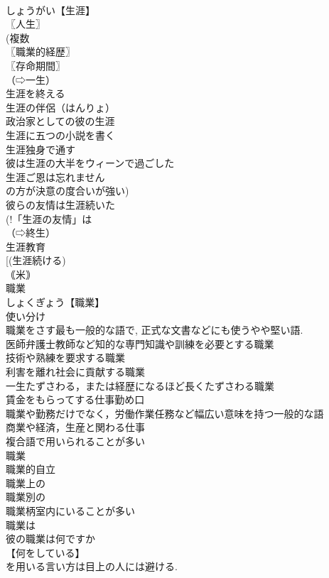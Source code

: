 \documentclass[8pt]{extreport}
\begin{document}
\begin{CJK}{UTF8}{min}
\\	しょうがい【生涯】
\\	〖人生〗
\\	(複数 
\\	〖職業的経歴〗
\\	〖存命期間〗
\\	（⇨一生）
\\	生涯を終える
\\	生涯の伴侶（はんりょ）
\\	政治家としての彼の生涯
\\	生涯に五つの小説を書く
\\	生涯独身で通す
\\	彼は生涯の大半をウィーンで過ごした
\\	生涯ご恩は忘れません
\\	の方が決意の度合いが強い) 
\\	彼らの友情は生涯続いた
\\	(!「生涯の友情」は 
\\	（⇨終生）
\\	生涯教育
\\	[(生涯続ける) 
\\	｟米｠ 
\\	職業		
\\	しょくぎょう【職業】
\\	使い分け
\\	職業をさす最も一般的な語で, 正式な文書などにも使うやや堅い語.
\\	医師弁護士教師など知的な専門知識や訓練を必要とする職業
\\	技術や熟練を要求する職業
\\	利害を離れ社会に貢献する職業
\\	一生たずさわる，または経歴になるほど長くたずさわる職業
\\	賃金をもらってする仕事勤め口
\\	職業や勤務だけでなく，労働作業任務など幅広い意味を持つ一般的な語
\\	商業や経済，生産と関わる仕事
\\	複合語で用いられることが多い
\\	職業~
\\	職業的自立
\\	職業上の
\\	職業別の
\\	職業柄室内にいることが多い
\\	職業は
\\	彼の職業は何ですか
\\	【何をしている】
\\	を用いる言い方は目上の人には避ける. 

\end{CJK}
\end{document}
